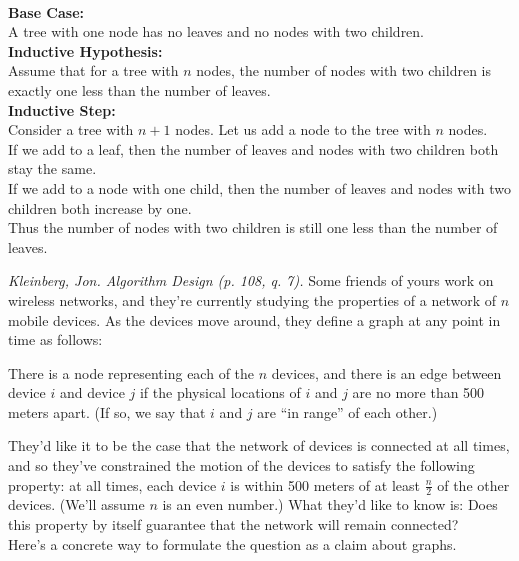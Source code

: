 \documentclass[solutionorbox,answers]{exam}
\begin{document}
\begin{questions}
\begin{solutionbox}{5in}    \vspace{1em}    \\                                                        
  \textbf{Base Case:} \\
  A tree with one node has no leaves and no nodes with two children. \\
  \textbf{Inductive Hypothesis:} \\
  Assume that for a tree with $n$ nodes, the number of nodes with two children is exactly one less than the number of leaves. \\
  \textbf{Inductive Step:} \\
  Consider a tree with $n+1$ nodes. Let us add a node to the tree with $n$ nodes. \\
  If we add to a leaf, then the number of leaves and nodes with two children both stay the same. \\
  If we add to a node with one child, then the number of leaves and nodes with two children both increase by one. \\
  Thus the number of nodes with two children is still one less than the number of leaves. \\
\end{solutionbox}
\pagebreak
\question \textit{Kleinberg, Jon. Algorithm Design (p. 108, q. 7).} Some friends of yours work on wireless networks, and they're currently studying the properties of a network of $n$ mobile devices. As the devices move around, they define a graph at any point in time as follows: 

{\leftskip=1cm\relax
 \rightskip=1cm\relax
 There is a node representing each of the $n$ devices, and there is an edge between device $i$ and device $j$ if the physical locations of $i$ and $j$ are no more than 500 meters apart. (If so, we say that $i$ and $j$ are “in range” of each other.)
 \par}

They'd like it to be the case that the network of devices is connected at all times, and so they've constrained the motion of the devices to satisfy the following property: at all times, each device $i$ is within 500 meters of at least $\frac{n}{2}$ of the other devices. (We'll assume $n$ is an even number.) What they'd like to know is: Does this property by itself guarantee that the network will remain connected? \\

Here’s a concrete way to formulate the question as a claim about graphs.\\


\end{questions}
\end{document}
